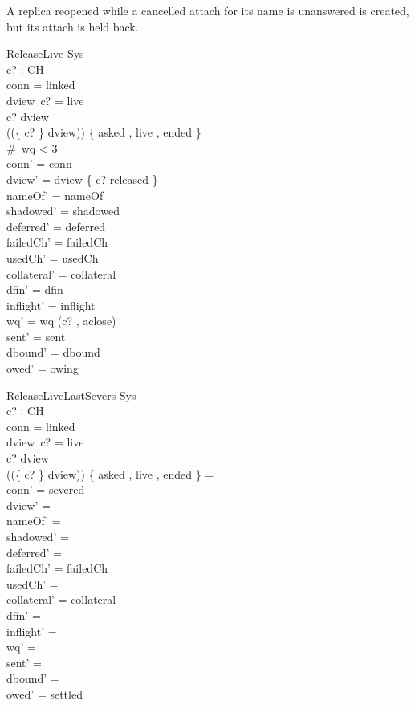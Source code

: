\documentclass[a4paper,10pt,fleqn]{article}
\begin{document}
A replica reopened while a cancelled attach for its name is unanswered is created, but its attach is held back.



\begin{schema}{ReleaseLive}
  \Delta Sys \\
  c? : CH \\
\where
  conn = linked \\
  dview~c? = live \\
  c? \in \dom dview \\
  (\ran (\{ c? \} \ndres dview)) \cap \{ asked , live , ended \} \neq \emptyset \\
  \#~wq < 3 \\
  conn' = conn \\
  dview' = dview \oplus \{ c? \mapsto released \} \\
  nameOf' = nameOf \\
  shadowed' = shadowed \\
  deferred' = deferred \\
  failedCh' = failedCh \\
  usedCh' = usedCh \\
  collateral' = collateral \\
  dfin' = dfin \\
  inflight' = inflight \\
  wq' = wq \cat \langle (c? , aclose) \rangle \\
  sent' = sent \\
  dbound' = dbound \\
  owed' = owing
\end{schema}

\begin{schema}{ReleaseLiveLastSevers}
  \Delta Sys \\
  c? : CH \\
\where
  conn = linked \\
  dview~c? = live \\
  c? \in \dom dview \\
  (\ran (\{ c? \} \ndres dview)) \cap \{ asked , live , ended \} = \emptyset \\
  conn' = severed \\
  dview' = \emptyset \\
  nameOf' = \emptyset \\
  shadowed' = \emptyset \\
  deferred' = \emptyset \\
  failedCh' = failedCh \\
  usedCh' = \emptyset \\
  collateral' = collateral \\
  dfin' = \emptyset \\
  inflight' = \langle \rangle \\
  wq' = \langle \rangle \\
  sent' = \langle \rangle \\
  dbound' = \emptyset \\
  owed' = settled
\end{schema}
\end{document}
